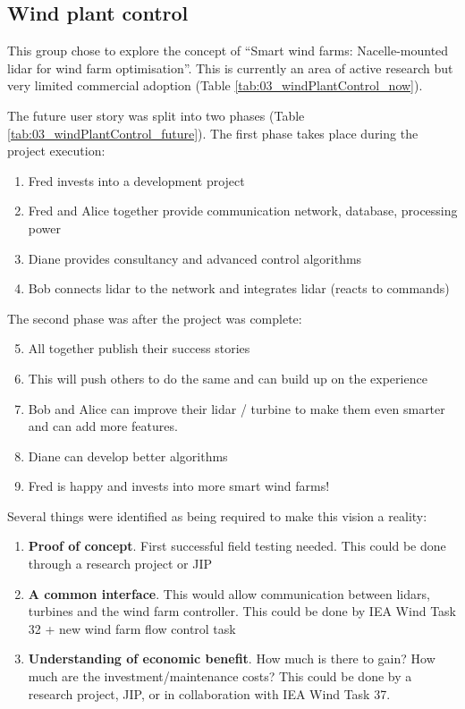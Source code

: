 \subsection{Wind plant control}

This group chose to explore the concept of ``Smart wind farms:
Nacelle-mounted lidar for wind farm optimisation''. This is currently an area of active research but very limited commercial adoption (Table \ref{tab:03_windPlantControl_now}).

The future user story was split into two phases (Table \ref{tab:03_windPlantControl_future}). The first phase takes place during the project execution:

\begin{enumerate}
\item
  Fred invests into a development project
\item
  Fred and Alice together provide communication network, database,
  processing power
\item
  Diane provides consultancy and advanced control algorithms
\item
  Bob connects lidar to the network and integrates lidar (reacts to
  commands)
\end{enumerate}

The second phase was after the project was complete:

\begin{enumerate}
\setcounter{enumi}{4}
\item
  All together publish their success stories
\item
  This will push others to do the same and can build up on the
  experience
\item
  Bob and Alice can improve their lidar / turbine to make them even
  smarter and can add more features.
\item
  Diane can develop better algorithms
\item
  Fred is happy and invests into more smart wind farms!
\end{enumerate}

Several things were identified as being required to make this vision a reality:

\begin{enumerate}
\item
  \textbf{Proof of concept}. First successful field testing needed. This
  could be done through a research project or JIP
\item
  \textbf{A common interface}. This would allow communication between
  lidars, turbines and the wind farm controller. This could be done by
  IEA Wind Task 32 + new wind farm flow control task
\item
  \textbf{Understanding of economic benefit}. How much is there to gain?
  How much are the investment/maintenance costs? This could be done by a
  research project, JIP, or in collaboration with IEA Wind Task 37.
\end{enumerate}


